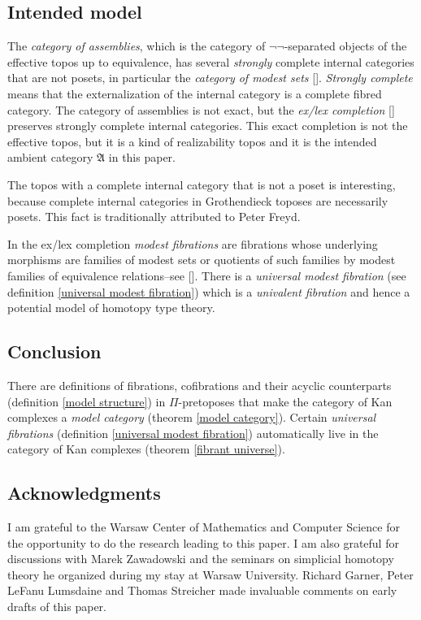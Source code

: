 \documentclass{tac}
\newcommand\citep[1]{[\cite{#1}]}
\newcommand\ambient{\mathfrak A}
\begin{document}
\subsection*{Intended model} The \emph{category of assemblies}, which is the category of $\neg\neg$-separated objects of the effective topos up to equivalence, has several \emph{strongly} complete internal categories that are not posets, in particular the \emph{category of modest sets} \citep{MR1097022,MR2479466,MR1023803}. \emph{Strongly complete} means that the externalization of the internal category is a complete fibred category. The category of assemblies is not exact, but the \emph{ex/lex completion} \citep{MR1600009} preserves strongly complete internal categories. This exact completion is not the effective topos, but it is a kind of realizability topos and it is the intended ambient category $\ambient$ in this paper. 

The topos with a complete internal category that is not a poset is interesting, because complete internal categories in Grothendieck toposes are necessarily posets. This fact is traditionally attributed to Peter Freyd.

In the ex/lex completion \emph{modest fibrations} are fibrations whose underlying morphisms are families of modest sets or quotients of such families by modest families of equivalence relations--see \citep{MR1097022,MR1023803,MR2479466}. There is a \emph{universal modest fibration} (see definition \ref{universal modest fibration}) which is a \emph{univalent fibration} and hence a potential model of homotopy type theory.

\subsection*{Conclusion} There are definitions of fibrations, cofibrations and their acyclic counterparts (definition \ref{model structure}) in $\Pi$-pretoposes that make the category of Kan complexes a \emph{model category} (theorem \ref{model category}). Certain \emph{universal fibrations} (definition \ref{universal modest fibration}) automatically live in the category of Kan complexes (theorem \ref{fibrant universe}).

\subsection*{Acknowledgments} 
I am grateful to the Warsaw Center of Mathematics and Computer Science for the opportunity to do the research leading to this paper. I am also grateful for discussions with Marek Zawadowski and the seminars on simplicial homotopy theory he organized during my stay at Warsaw University. Richard Garner, Peter LeFanu Lumsdaine and Thomas Streicher made invaluable comments on early drafts of this paper.














\printbibliography
\end{document}
